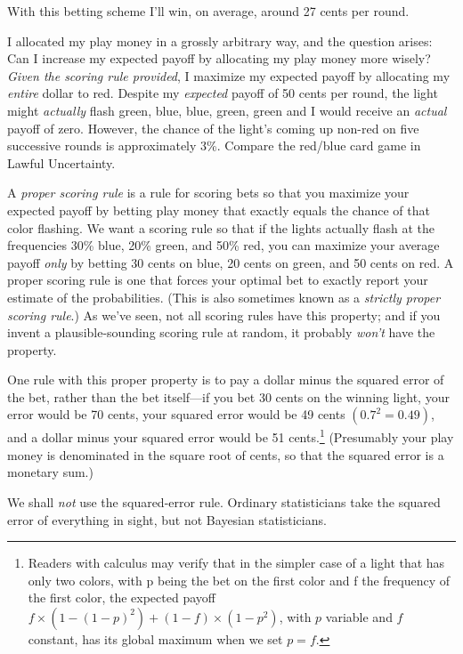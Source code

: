{
 With this betting scheme I'll win, on average,
around 27 cents per round.}

{
 I allocated my play money in a grossly arbitrary way, and the
question arises: Can I increase my expected payoff by allocating my
play money more wisely? \textit{Given the scoring rule provided}, I
maximize my expected payoff by allocating my \textit{entire} dollar to
red. Despite my \textit{expected} payoff of 50 cents per round, the
light might \textit{actually} flash green, blue, blue, green, green and
I would receive an \textit{actual} payoff of zero. However, the chance
of the light's coming up non-red on five successive
rounds is approximately 3\%. Compare the red/blue card game in Lawful
Uncertainty.}

{
 A \textit{proper scoring rule} is a rule for scoring bets so that
you maximize your expected payoff by betting play money that exactly
equals the chance of that color flashing. We want a scoring rule so
that if the lights actually flash at the frequencies 30\% blue, 20\%
green, and 50\% red, you can maximize your average payoff \textit{only}
by betting 30 cents on blue, 20 cents on green, and 50 cents on red. A
proper scoring rule is one that forces your optimal bet to exactly
report your estimate of the probabilities. (This is also sometimes
known as a \textit{strictly proper scoring rule}.) As
we've seen, not all scoring rules have this property;
and if you invent a plausible-sounding scoring rule at random, it
probably \textit{won't} have the property.}

{
 One rule with this proper property is to pay a dollar minus the
squared error of the bet, rather than the bet itself---if you bet 30
cents on the winning light, your error would be 70 cents, your squared
error would be 49 cents $(0.7^2 = 0.49)$, and a dollar
minus your squared error would be 51 cents.\footnote{Readers with calculus may verify that in the simpler case of a
light that has only two colors, with p being the bet on the first color
and f the frequency of the first color, the expected payoff $f
\times (1 - (1 - p)^2) + (1 - f) \times (1 - p^2)$, with $p$ variable and $f$ constant, has its global
maximum when we set $p = f$.}
(Presumably your play money is denominated in the square root of cents,
so that the squared error is a monetary sum.)}

{
 We shall \textit{not} use the squared-error rule. Ordinary
statisticians take the squared error of everything in sight, but not
Bayesian statisticians.}

